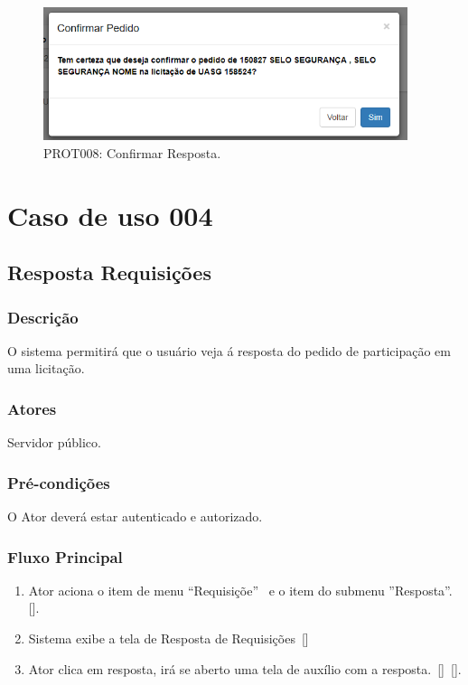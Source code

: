 \begin{anexosenv}
\begin{figure}[htbp]
    \centering
    \includegraphics[width=0.95\textwidth]{figuras/prototipo008.png}
    \caption[PROT008: Confirmar Resposta]{PROT008: Confirmar Resposta.}
    \label{PROT008}
\end{figure}

\chapter{Caso de uso 004}\label{CASO004}

\section*{Resposta Requisições}

\subsection*{Descrição}
O sistema permitirá que o usuário veja á resposta do pedido de participação em uma licitação.

\subsection*{Atores}
Servidor público.

\subsection*{Pré-condições}
O Ator deverá estar autenticado e autorizado.

\subsection*{Fluxo Principal}
\begin{enumerate}
    \item Ator aciona o item de menu ``Requisiçõe''~ e o item do submenu ''Resposta''.[].
    \item\label{FP004002} Sistema exibe a tela de Resposta de  Requisições~[]
    \item\label{FP004003} Ator clica em resposta, irá se aberto uma tela de auxílio com a resposta.~[]~[].
\end{enumerate}


\end{anexosenv}
